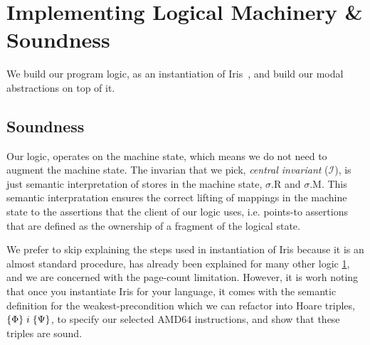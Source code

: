 \section{Implementing Logical Machinery \& Soundness}
We build our program logic, as an instantiation of Iris~\cite{iris}, and build our modal abstractions on top of it. 
\subsection{Soundness}
\label{sec:soundness}
Our logic, operates on the machine state, which means we do not need to augment the machine state. The invarian that we pick, \textit{central invariant} ($\mathcal{I}$), is just semantic interpretation of stores in the machine state, $\sigma$.R and $\sigma$.M. This semantic interpratation ensures the correct lifting of mappings in the machine state to the assertions that the client of our logic uses, i.e. points-to assertions that are defined as the ownership of a fragment of the logical state.


We prefer to skip explaining the steps used in instantiation of Iris because it is an almost standard procedure, has already been explained for many other logic \ref{}, and we are concerned with the page-count limitation. However, it is worh noting that once you instantiate Iris for your language, it comes with the semantic definition for the weakest-precondition which we can refactor into Hoare triples, $\{\Phi\}\;i\;\{\Psi\}$, to specify our  selected \textsf{AMD64} instructions, and show that these triples are sound. 

